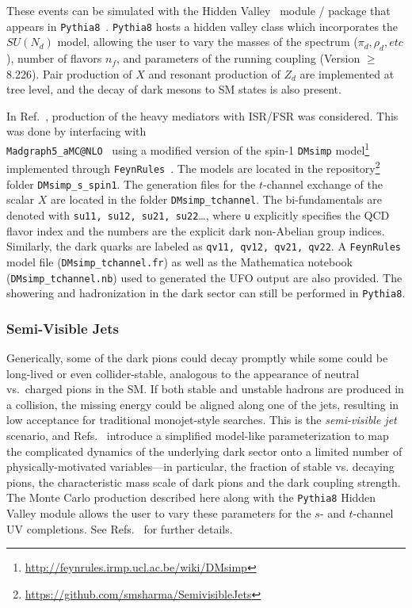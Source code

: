 
These events can be simulated with the Hidden Valley~\cite{Carloni:2010tw} module / package that appears in \texttt{Pythia8}~\cite{Sjostrand:2014zea}. \texttt{Pythia8} hosts a hidden valley class which incorporates the $SU(N_{d})$ model, allowing the user to vary the masses of the spectrum ($\pi_{d}, \rho_{d}, etc$), number of flavors $n_{f}$, and parameters of the running coupling (Version $\geq$ 8.226). Pair production of $X$ and resonant production of $Z_d$ are implemented at tree level, and the decay of dark mesons to SM states is also present.

In Ref.~\cite{Cohen:2017pzm}, production of the heavy mediators with ISR/FSR was considered. This was done by interfacing with\\
 \texttt{Madgraph5\_aMC@NLO}~\cite{Alwall:2014hca} using a modified version of the spin-1 \texttt{DMsimp} model\footnote{\url{http://feynrules.irmp.ucl.ac.be/wiki/DMsimp}} implemented through \texttt{FeynRules}~\cite{Alloul:2013bka}. The models are located in the repository\footnote{\url{https://github.com/smsharma/SemivisibleJets}} folder \texttt{DMsimp\_s\_spin1}. The generation files for the $t$-channel exchange of the scalar $X$ are located in the folder \texttt{DMsimp\_tchannel}. The bi-fundamentals are denoted with \texttt{su11, su12, su21, su22}\ldots, where \texttt{u} explicitly specifies the QCD flavor index and the numbers are the explicit dark non-Abelian group indices. Similarly, the dark quarks are labeled as \texttt{qv11, qv12, qv21, qv22}. A \texttt{FeynRules} model file (\texttt{DMsimp\_tchannel.fr}) as well as the Mathematica notebook (\texttt{DMsimp\_tchannel.nb}) used to generated the UFO output are also provided. The showering and hadronization in the dark sector can still be performed in \texttt{Pythia8}.

\subsubsection{Semi-Visible Jets}

Generically, some of the dark pions could decay promptly while some could be long-lived or even collider-stable, analogous to the appearance of neutral vs.~charged pions in the SM. If both stable and unstable hadrons are produced in a collision, the missing energy could be aligned along one of the jets, resulting in low acceptance for traditional monojet-style searches. This is the {\em semi-visible jet} scenario, and Refs.~\cite{Cohen:2015toa,Cohen:2017pzm,Beauchesne:2017yhh} introduce a simplified model-like parameterization to map the complicated dynamics of the underlying dark sector onto a limited number of physically-motivated variables---in particular, the fraction of stable vs. decaying pions, the characteristic mass scale of dark pions and the dark coupling strength. The Monte Carlo production described here along with the \texttt{Pythia8} Hidden Valley module allows the user to vary these parameters for the $s$- and $t$-channel UV completions. See Refs.~\cite{Cohen:2015toa,Cohen:2017pzm,Beauchesne:2017yhh} for further details.

